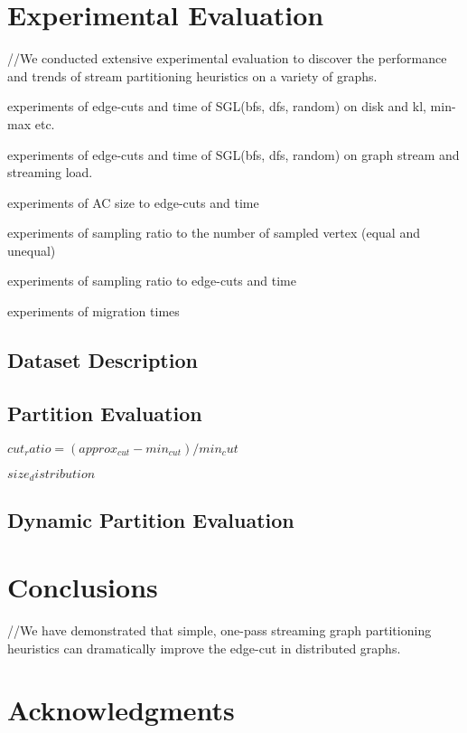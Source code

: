 \documentclass{sig-alternate-2013}
\begin{document}
\section{Experimental Evaluation}
//We conducted extensive experimental evaluation to discover the performance and trends of stream partitioning heuristics on a variety of graphs.

experiments of edge-cuts and time of SGL(bfs, dfs, random) on disk and kl, min-max etc.

experiments of edge-cuts and time of SGL(bfs, dfs, random) on graph stream and streaming load\cite{Stanton:streampartition}.

experiments of AC size to edge-cuts and time

experiments of sampling ratio to the number of sampled vertex (equal and unequal)

experiments of sampling ratio to edge-cuts and time

experiments of migration times


\subsection{Dataset Description}

\subsection{Partition Evaluation}

$cut_ratio = (approx_{cut}-min_{cut})/min_cut$

$size_distribution$

\subsection{Dynamic Partition Evaluation}

\section{Conclusions}
//We have demonstrated that simple, one-pass streaming graph partitioning heuristics can dramatically improve the edge-cut in distributed graphs.
\section{Acknowledgments}




\balancecolumns
\end{document}
